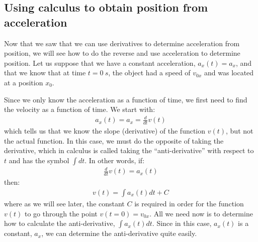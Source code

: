 \subsection{Using calculus to obtain position from acceleration}
Now that we saw that we can use derivatives to determine acceleration from position, we will see how to do the reverse and use acceleration to determine position. Let us suppose that we have a constant acceleration, $a_x(t)=a_x$, and that we know that at time $t=\SI{0}{s}$, the object had a speed of $v_{0x}$ and was located at a position $x_0$. 

Since we only know the acceleration as a function of time, we first need to find the velocity as a function of time. We start with:
\begin{align*}
a_x(t)=a_x=\frac{d}{dt} v(t)
\end{align*}
which tells us that we know the slope (derivative) of the function $v(t)$, but not the actual function. In this case, we must do the opposite of taking the derivative, which in calculus is called taking the ``anti-derivative'' with respect to $t$ and has the symbol $\int dt$. In other words, if:
\begin{align*}
\frac{d}{dt} v(t) =a_x(t)
\end{align*}
then:
\begin{align*}
v(t) =\int a_x(t) dt +C
\end{align*}
where as we will see later, the constant $C$ is required in order for the function $v(t)$ to go through the point $v(t=0)=v_{0x}$. All we need now is to determine how to calculate the anti-derivative, $\int a_x(t) dt$. Since in this case, $a_x(t)$ is a constant, $a_x$, we can determine the anti-derivative quite easily. 

